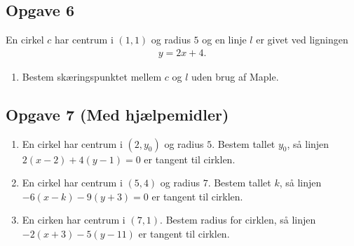 \documentclass[12pt]{article}
\begin{document}
\subsection*{Opgave 6}
En cirkel $c$ har centrum i $(1,1)$ og radius $5$ og en linje $l$ er givet ved ligningen
\begin{align*}
	y = 2x + 4.
\end{align*}
\begin{enumerate}[label=\roman*)]
	\item Bestem skæringspunktet mellem $c$ og $l$ uden brug af Maple. 
\end{enumerate}

\subsection*{Opgave 7 (Med hjælpemidler)}
\begin{enumerate}[label=\roman*)]
	\item En cirkel har centrum i $(2,y_0)$ og radius $5$. Bestem tallet $y_0$, så linjen $2(x-2) + 4(y-1) = 0$ 
	er tangent til cirklen.
	\item En cirkel har centrum i $(5,4)$ og radius $7$. Bestem tallet $k$, så linjen $-6(x-k)-9(y+3) = 0$ er 
	tangent til cirklen.
	\item En cirken har centrum i $(7,1)$. Bestem radius for cirklen, så linjen $-2(x+3)-5(y-11)$ er tangent
	til cirklen. 
\end{enumerate}
\end{document}
